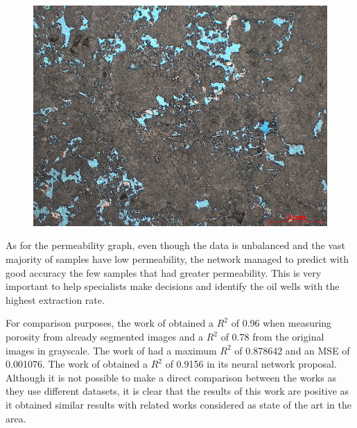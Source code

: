 \documentclass[a4paper,fleqn]{cas-sc}
\begin{document}
\begin{figure}[h!]
\begin{minipage}{0.3\textwidth}
		\includegraphics[width=\textwidth]{images/3-SPS-69_T01_4994,85_1,25x.jpg}
	\end{minipage}
\end{figure}

As for the permeability graph, even though the data is unbalanced and the vast majority of samples have low permeability, the network managed to predict with good accuracy the few samples that had greater permeability. This is very important to help specialists make decisions and identify the oil wells with the highest extraction rate.

For comparison purposes, the work of  obtained a $R^2$ of 0.96 when measuring porosity from already segmented images and a $R^2$ of 0.78 from the original images in grayscale. The work of  had a maximum $R^2$ of 0.878642 and an MSE of 0.001076. The work of  obtained a $R^2$ of 0.9156 in its neural network proposal. Although it is not possible to make a direct comparison between the works as they use different datasets, it is clear that the results of this work are positive as it obtained similar results with related works considered as state of the art in the area.

\end{document}
